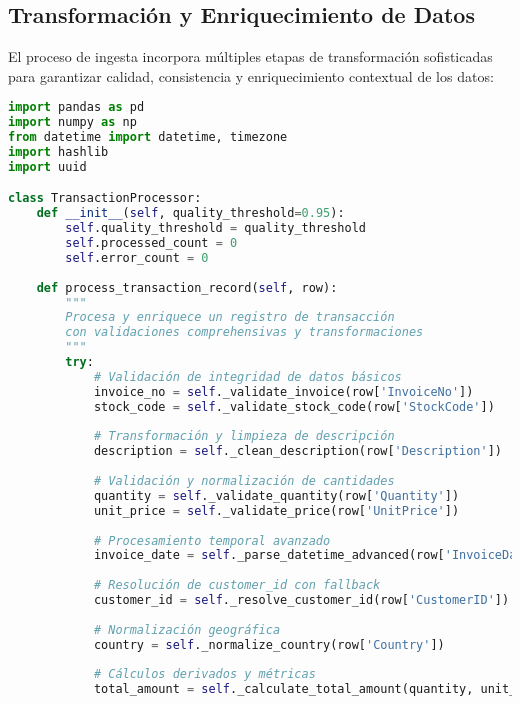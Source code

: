 \subsection{Transformación y Enriquecimiento de Datos}
\label{subsec:transformacion_datos}

El proceso de ingesta incorpora múltiples etapas de transformación sofisticadas para garantizar calidad, consistencia y enriquecimiento contextual de los datos:

\vspace{0.2cm}

\begin{lstlisting}[language=python, caption=Lógica de Procesamiento y Enriquecimiento de Transacciones, label=lst:data_processing]
import pandas as pd
import numpy as np
from datetime import datetime, timezone
import hashlib
import uuid

class TransactionProcessor:
    def __init__(self, quality_threshold=0.95):
        self.quality_threshold = quality_threshold
        self.processed_count = 0
        self.error_count = 0
        
    def process_transaction_record(self, row):
        """
        Procesa y enriquece un registro de transacción
        con validaciones comprehensivas y transformaciones
        """
        try:
            # Validación de integridad de datos básicos
            invoice_no = self._validate_invoice(row['InvoiceNo'])
            stock_code = self._validate_stock_code(row['StockCode'])
            
            # Transformación y limpieza de descripción
            description = self._clean_description(row['Description'])
            
            # Validación y normalización de cantidades
            quantity = self._validate_quantity(row['Quantity'])
            unit_price = self._validate_price(row['UnitPrice'])
            
            # Procesamiento temporal avanzado
            invoice_date = self._parse_datetime_advanced(row['InvoiceDate'])
            
            # Resolución de customer_id con fallback
            customer_id = self._resolve_customer_id(row['CustomerID'])
            
            # Normalización geográfica
            country = self._normalize_country(row['Country'])
            
            # Cálculos derivados y métricas
            total_amount = self._calculate_total_amount(quantity, unit_price)
            

\end{lstlisting}
